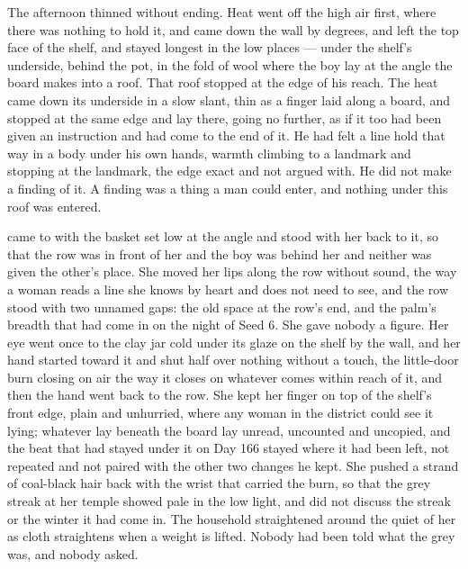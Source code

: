 The afternoon thinned without ending. Heat went off the high air first, where there was nothing to hold it, and came down the wall by degrees, and left the top face of the shelf, and stayed longest in the low places --- under the shelf's underside, behind the pot, in the fold of wool where the boy lay at the angle the board makes into a roof. That roof stopped at the edge of his reach. The heat came down its underside in a slow slant, thin as a finger laid along a board, and stopped at the same edge and lay there, going no further, as if it too had been given an instruction and had come to the end of it. He had felt a line hold that way in a body under his own hands, warmth climbing to a landmark and stopping at the landmark, the edge exact and not argued with. He did not make a finding of it. A finding was a thing a man could enter, and nothing under this roof was entered.

\scenebreak

 came to  with the basket set low at the angle and stood with her back to it, so that the row was in front of her and the boy was behind her and neither was given the other's place. She moved her lips along the row without sound, the way a woman reads a line she knows by heart and does not need to see, and the row stood with two unnamed gaps: the old space at the row's end, and the palm's breadth that had come in on the night of Seed 6. She gave nobody a figure. Her eye went once to the clay jar cold under its glaze on the shelf by the wall, and her hand started toward it and shut half over nothing without a touch, the little-door burn closing on air the way it closes on whatever comes within reach of it, and then the hand went back to the row. She kept her finger on top of the shelf's front edge, plain and unhurried, where any woman in the district could see it lying; whatever lay beneath the board lay unread, uncounted and uncopied, and the beat that had stayed under it on Day 166 stayed where it had been left, not repeated and not paired with the other two changes he kept. She pushed a strand of coal-black hair back with the wrist that carried the burn, so that the grey streak at her temple showed pale in the low light, and did not discuss the streak or the winter it had come in. The household straightened around the quiet of her as cloth straightens when a weight is lifted. Nobody had been told what the grey was, and nobody asked.


